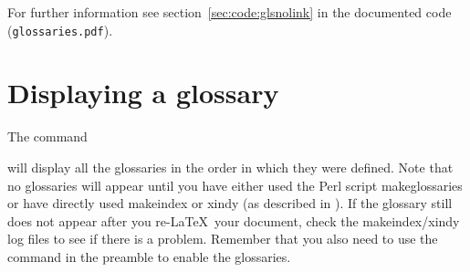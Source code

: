\documentclass{nlctdoc}
\begin{document}
For further information see \ifpdf section~\ref*{sec:code:glsnolink}
\fi {} in the documented code (\texttt{glossaries.pdf}).

\section{Displaying a glossary}
\label{sec:printglossary}

The command
\begin{definition}[\DescribeMacro{\printglossaries}]
\end{definition}
will display all the glossaries in the order in which they were
defined. Note that no glossaries will appear until you have either
used the Perl script \gls{makeglossaries} or have directly used
\gls{makeindex} or \gls{xindy} (as described in
). If the glossary 
still does not appear after you re-\LaTeX\ your document, check the
\gls*{makeindex}/\gls*{xindy} log files to see if there is a problem.
Remember that you also need to use the command 
in the preamble to enable the glossaries.
\end{document}
